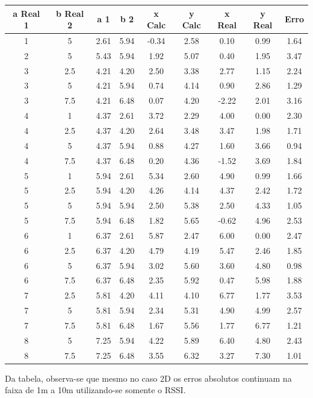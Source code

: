 \begin{center}
    \begin{tabular}{||c c c c c c c c c||} 
    \hline
    a Real 1 & b Real 2 & a 1 & b 2 & x Calc & y Calc	& x Real & y Real & Erro\\ [0.5ex] 
    \hline\hline
    1 & 5 & 2.61 & 5.94 & -0.34 & 2.58 & 0.10 & 0.99 & 1.64\\ 
    \hline
    2 & 5 & 5.43 & 5.94 & 1.92 & 5.07 & 0.40 & 1.95 & 3.47\\ 
    \hline
    3 & 2.5 & 4.21 & 4.20 & 2.50 & 3.38 & 2.77 & 1.15 & 2.24\\ 
    \hline
    3 & 5 & 4.21 & 5.94 & 0.74 & 4.14 & 0.90 & 2.86 & 1.29\\ 
    \hline
    3 & 7.5 & 4.21 & 6.48 & 0.07 & 4.20 & -2.22 & 2.01 & 3.16\\ 
    \hline
    4 & 1 & 4.37 & 2.61 & 3.72 & 2.29 & 4.00 & 0.00 & 2.30\\ 
    \hline
    4 & 2.5 & 4.37 & 4.20 & 2.64 & 3.48 & 3.47 & 1.98 & 1.71\\ 
    \hline
    4 & 5 & 4.37 & 5.94 & 0.88 & 4.27 & 1.60 & 3.66 & 0.94\\ 
    \hline
    4 & 7.5 & 4.37 & 6.48 & 0.20 & 4.36 & -1.52 & 3.69 & 1.84\\ 
    \hline
    5 & 1 & 5.94 & 2.61 & 5.34 & 2.60 & 4.90 & 0.99 & 1.66\\ 
    \hline
    5 & 2.5 & 5.94 & 4.20 & 4.26 & 4.14 & 4.37 & 2.42 & 1.72\\ 
    \hline
    5 & 5 & 5.94 & 5.94 & 2.50 & 5.38 & 2.50 & 4.33 & 1.05\\ 
    \hline
    5 & 7.5 & 5.94 & 6.48 & 1.82 & 5.65 & -0.62 & 4.96 & 2.53\\ 
    \hline
    6 & 1 & 6.37 & 2.61 & 5.87 & 2.47 & 6.00 & 0.00 & 2.47\\ 
    \hline
    6 & 2.5 & 6.37 & 4.20 & 4.79 & 4.19 & 5.47 & 2.46 & 1.85\\ 
    \hline
    6 & 5 & 6.37 & 5.94 & 3.02 & 5.60 & 3.60 & 4.80 & 0.98\\ 
    \hline
    6 & 7.5 & 6.37 & 6.48 & 2.35 & 5.92 & 0.47 & 5.98 & 1.88\\ 
    \hline
    7 & 2.5 & 5.81 & 4.20 & 4.11 & 4.10 & 6.77 & 1.77 & 3.53\\ 
    \hline
    7 & 5 & 5.81 & 5.94 & 2.34 & 5.31 & 4.90 & 4.99 & 2.57\\ 
    \hline
    7 & 7.5 & 5.81 & 6.48 & 1.67 & 5.56 & 1.77 & 6.77 & 1.21\\ 
    \hline
    8 & 5 & 7.25 & 5.94 & 4.22 & 5.89 & 6.40 & 4.80 & 2.43\\ 
    \hline
    8 & 7.5 & 7.25 & 6.48 & 3.55 & 6.32 & 3.27 & 7.30 & 1.01\\ [1ex] 
    \hline
   \end{tabular}
   \end{center}

   Da tabela, observa-se que mesmo no caso 2D os erros absolutos continuam na faixa de 1m a 10m utilizando-se somente o RSSI.







   
   

